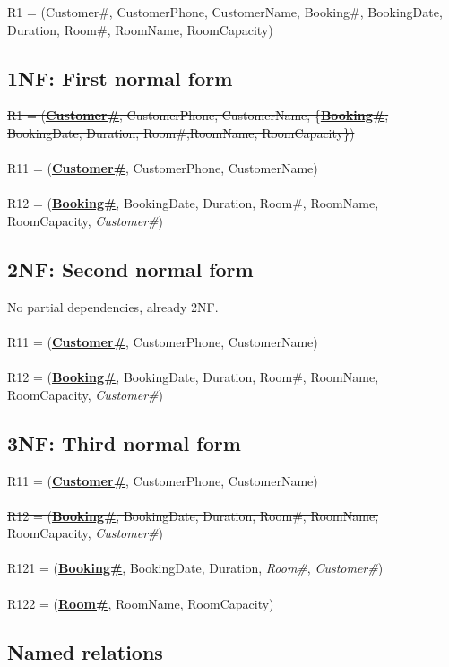R1 = (Customer\#, CustomerPhone, CustomerName, {Booking\#, BookingDate, Duration, Room\#, RoomName, RoomCapacity})

\subsection{1NF: First normal form}

\sout{R1 = (\textbf{\underline{Customer\#}}, CustomerPhone, CustomerName, \{\textbf{\underline{Booking\#}}, BookingDate, Duration, Room\#,RoomName, RoomCapacity\})}
\\\\
R11 = (\textbf{\underline{Customer\#}}, CustomerPhone, CustomerName)
\\\\
R12 = (\textbf{\underline{Booking\#}}, BookingDate, Duration, Room\#, RoomName, RoomCapacity, \emph{Customer\#})

\subsection{2NF: Second normal form}

No partial dependencies, already 2NF.
\\\\
R11 = (\textbf{\underline{Customer\#}}, CustomerPhone, CustomerName)
\\\\
R12 = (\textbf{\underline{Booking\#}}, BookingDate, Duration, Room\#, RoomName, RoomCapacity, \emph{Customer\#})

\subsection{3NF: Third normal form}

R11 = (\textbf{\underline{Customer\#}}, CustomerPhone, CustomerName)
\\\\
\sout{R12 = (\textbf{\underline{Booking\#}}, BookingDate, Duration, Room\#, RoomName, RoomCapacity, \emph{Customer\#})}
\\\\
R121 = (\textbf{\underline{Booking\#}}, BookingDate, Duration, \emph{Room\#}, \emph{Customer\#})
\\\\
R122 = (\textbf{\underline{Room\#}}, RoomName, RoomCapacity)

\subsection{Named relations}

